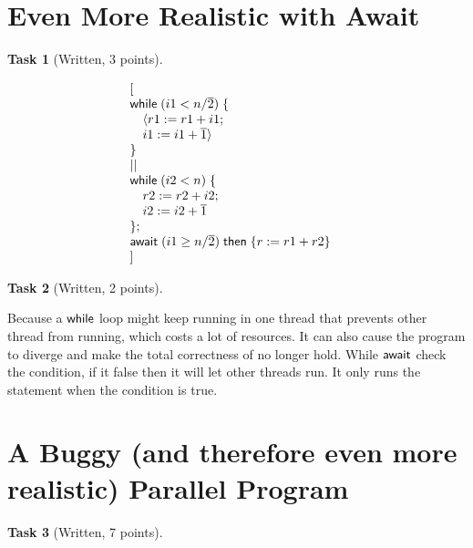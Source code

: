 \documentclass{article}
\newcommand{\stmt}[1]{\text{\sffamily #1}}
\newcommand{\while}[1]{\stmt{while}\;(#1)\;\{}
\newcommand{\assign}[2]{#1 := #2}
\newcommand{\const}[1]{\overline{#1}}
\newcommand{\await}[2]{\stmt{await}\;(\ensuremath{#1})\;\stmt{then}\;\{#2\}}
\theoremstyle{task}
\newtheorem{task}{Task}[section]
\begin{document}
\section{Even More Realistic with Await}

\begin{task}[Written, 3 points]
\end{task}
\[
    \begin{array}{l l}
        \lbrack & \\
        \while{i1 < n/\const{2}} & \\
        \quad \langle \assign{r1}{r1 + i1}; & \\
        \quad \assign{i1}{i1 + \const{1}} \rangle & \\
        \} & \\
        || & \\
        \while{i2 < n} & \\
        \quad \assign{r2}{r2 + i2}; & \\
        \quad \assign{i2}{i2 + \const{1}} & \\
        \}; & \\
        \await{i1 \geq n/\const{2}}{\assign{r}{r1 + r2}} & \\
        \rbrack &
    \end{array}
\]

\begin{task}[Written, 2 points]
\end{task}

Because a $\stmt{while}$ loop might keep running in one thread that prevents
other thread from running, which costs a lot of resources. It can also cause the
program to diverge and make the total correctness of no longer hold. While
$\stmt{await}$ check the condition, if it false then it will let other threads
run. It only runs the statement when the condition is true.

\section{A Buggy (and therefore even more realistic) Parallel Program}

\begin{task}[Written, 7 points]
\end{task}
\end{document}
